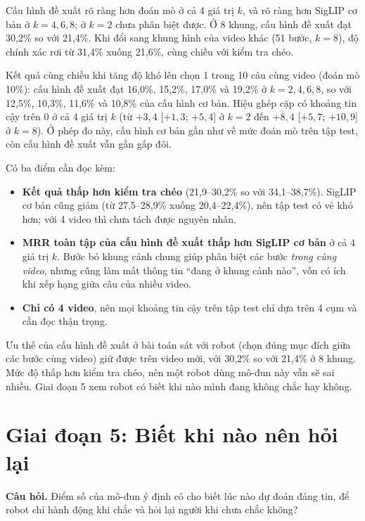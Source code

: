 \documentclass[a4paper,oneside]{report}
\begin{document}
Cấu hình đề xuất rõ ràng hơn đoán mò ở cả 4 giá trị $k$, và rõ ràng hơn SigLIP cơ bản ở $k=4,6,8$; ở $k=2$ chưa phân biệt được. Ở 8 khung, cấu hình đề xuất đạt 30,2\% so với 21,4\%. Khi đổi sang khung hình của video khác (51 bước, $k=8$), độ chính xác rơi từ 31,4\% xuống 21,6\%, cùng chiều với kiểm tra chéo.

Kết quả cùng chiều khi tăng độ khó lên chọn 1 trong 10 câu cùng video (đoán mò 10\%): cấu hình đề xuất đạt 16,0\%, 15,2\%, 17,0\% và 19,2\% ở $k=2,4,6,8$, so với 12,5\%, 10,3\%, 11,6\% và 10,8\% của cấu hình cơ bản. Hiệu ghép cặp có khoảng tin cậy trên 0 ở cả 4 giá trị $k$ (từ $+3{,}4$ [$+1{,}3$; $+5{,}4$] ở $k=2$ đến $+8{,}4$ [$+5{,}7$; $+10{,}9$] ở $k=8$). Ở phép đo này, cấu hình cơ bản gần như về mức đoán mò trên tập test, còn cấu hình đề xuất vẫn gần gấp đôi.

Có ba điểm cần đọc kèm:
\begin{itemize}
  \item \textbf{Kết quả thấp hơn kiểm tra chéo} (21,9--30,2\% so với 34,1--38,7\%). SigLIP cơ bản cũng giảm (từ 27,5--28,9\% xuống 20,4--22,4\%), nên tập test có vẻ khó hơn; với 4 video thì chưa tách được nguyên nhân.
  \item \textbf{MRR toàn tập của cấu hình đề xuất thấp hơn SigLIP cơ bản} ở cả 4 giá trị $k$. Bước bỏ khung cảnh chung giúp phân biệt các bước \textit{trong cùng video}, nhưng cũng làm mất thông tin ``đang ở khung cảnh nào'', vốn có ích khi xếp hạng giữa câu của nhiều video.
  \item \textbf{Chỉ có 4 video}, nên mọi khoảng tin cậy trên tập test chỉ dựa trên 4 cụm và cần đọc thận trọng.
\end{itemize}

\begin{ketqua}
Ưu thế của cấu hình đề xuất ở bài toán sát với robot (chọn đúng mục đích giữa các bước cùng video) giữ được trên video mới, với 30,2\% so với 21,4\% ở 8 khung. Mức độ thấp hơn kiểm tra chéo, nên một robot dùng mô-đun này vẫn sẽ sai nhiều. Giai đoạn 5 xem robot có biết khi nào mình đang không chắc hay không.
\end{ketqua}

\section{Giai đoạn 5: Biết khi nào nên hỏi lại}
\label{sec:stage5}

\textbf{Câu hỏi.} Điểm số của mô-đun ý định có cho biết lúc nào dự đoán đáng tin, để robot chỉ hành động khi chắc và hỏi lại người khi chưa chắc không?
\end{document}

